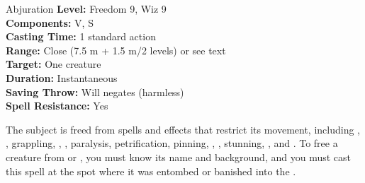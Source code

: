 {Abjuration}
{
	\textbf{Level:}
	Freedom 9, Wiz 9\\
	\textbf{Components:}
	V, S\\
	\textbf{Casting Time:}
	1 standard action\\
	\textbf{Range:}
	Close (7.5 m + 1.5 m/2 levels) or see text\\
	\textbf{Target:}
	One creature\\
	\textbf{Duration:}
	Instantaneous\\
	\textbf{Saving Throw:}
	Will negates (harmless)\\
	\textbf{Spell Resistance:}
	Yes\\
}
{
	The subject is freed from spells and effects that restrict its movement, including , , grappling, , , paralysis, petrification, pinning, , , stunning, , and . To free a creature from  or , you must know its name and background, and you must cast this spell at the spot where it was entombed or banished into the .

}
